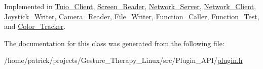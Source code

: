 Implemented in \hyperlink{class_tuio___client_a2df126802294be8dc168c409af801779}{Tuio\+\_\+\+Client}, \hyperlink{class_screen___reader_a40e260696012cdb8ab05d65511b7de6e}{Screen\+\_\+\+Reader}, \hyperlink{class_network___server_a9a4400df0ce8da4c24c8758201b68562}{Network\+\_\+\+Server}, \hyperlink{class_network___client_ad54dbc2ec20d9fbabcb5265401d072c2}{Network\+\_\+\+Client}, \hyperlink{class_joystick___writer_a3c606f3961eea4b6a371146479ca26da}{Joystick\+\_\+\+Writer}, \hyperlink{class_camera___reader_afac6f0a4e2c0df76cad8f1d0d20cdc59}{Camera\+\_\+\+Reader}, \hyperlink{class_file___writer_ad420a007be3af0efd8ea76bac66e2cb0}{File\+\_\+\+Writer}, \hyperlink{class_function___caller_af099d310156da34103de5486995b00e2}{Function\+\_\+\+Caller}, \hyperlink{class_function___test_ac4a090ec1f44393fc7a8e851cb76fb29}{Function\+\_\+\+Test}, and \hyperlink{class_color___tracker_acc726eb03c58c22460c4f0440cfbc4cc}{Color\+\_\+\+Tracker}.



The documentation for this class was generated from the following file\+:\begin{DoxyCompactItemize}
\item 
/home/patrick/projects/\+Gesture\+\_\+\+Therapy\+\_\+\+Linux/src/\+Plugin\+\_\+\+A\+P\+I/\hyperlink{plugin_8h}{plugin.\+h}\end{DoxyCompactItemize}
